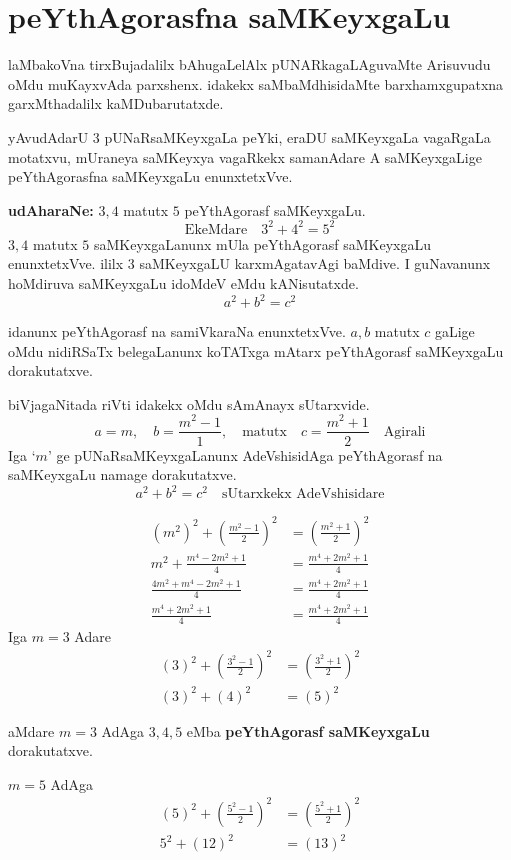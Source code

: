 \chapter{peYthAgorasfna saMKeyxgaLu}
\vskip -20pt

laMbakoVna tirxBujadalilx bAhugaLelAlx pUNARkagaLAguvaMte Arisuvudu oMdu muKayxvAda parxshenx. idakekx saMbaMdhisidaMte barxhamxgupatxna garxMthadalilx kaMDubarutatxde.

yAvudAdarU $3$ pUNaRsaMKeyxgaLa peYki, eraDU saMKeyxgaLa vagaRgaLa motatxvu, mUraneya saMKeyxya vagaRkekx samanAdare A saMKeyxgaLige peYthAgorasfna saMKeyxgaLu enunxtetxVve.

\textbf{udAharaNe:} $3,4$ matutx $5$  peYthAgorasf saMKeyxgaLu.
$$
\text{EkeMdare}\quad 3^2+4^2=5^2
$$
$3,4$ matutx $5$ saMKeyxgaLanunx mUla peYthAgorasf saMKeyxgaLu enunxtetxVve. ililx $3$ saMKeyx\-gaLU karxmAgatavAgi baMdive. I guNavanunx hoMdiruva saMKeyxgaLu idoMdeV eMdu kANisutatxde.
$$
a^2+b^2 = c^2
$$

idanunx peYthAgorasf  na samiVkaraNa enunxtetxVve. $a,b$ matutx $c$ gaLige oMdu nidiRSaTx belegaLanunx koTATxga mAtarx peYthAgorasf saMKeyxgaLu dorakutatxve.

biVjagaNitada riVti idakekx oMdu sAmAnayx sUtarxvide.
$$
a=m, \quad b= \frac{m^2-1}{1}, \quad\text{matutx} \quad c=\frac{m^2+1}{2} \quad \text{Agirali}
$$
Iga `$m$' ge pUNaRsaMKeyxgaLanunx AdeVshisidAga peYthAgorasf na saMKeyxgaLu namage dorakutatxve.
$$
a^2+b^2=c^2 \quad\text{sUtarxkekx AdeVshisidare}
$$

\begin{align*}
\left(m^2\right)^2+\left(\frac{m^2-1}{2}\right)^2 &= \left(\frac{m^2+1}{2}\right)^2\\
m^2+ \frac{m^4-2m^2+1}{4} &= \frac{m^4+2m^2+1}{4}\\
\frac{4m^2+m^4-2m^2+1}{4} &= \frac{m^4+2m^2+1}{4}\\
\frac{m^4+2m^2+1}{4} &= \frac{m^4+2m^2+1}{4}
\end{align*}
Iga $m=3$ Adare
\begin{align*}
(3)^2+\left(\frac{3^{2}-1}{2}\right)^2 &= \left(\frac{3^2+1}{2}\right)^2\\
(3)^2+(4)^2 &= (5)^2
\end{align*}

aMdare $m=3$ AdAga $3,4,5$ eMba {\bf peYthAgorasf saMKeyxgaLu} dorakutatxve.

$m=5$ \quad AdAga
\begin{align*}
(5)^2 + \left(\frac{5^2-1}{2}\right)^2 &= \left(\frac{5^2+1}{2}\right)^2\\
5^2 +(12)^2 &= (13)^2
\end{align*}

